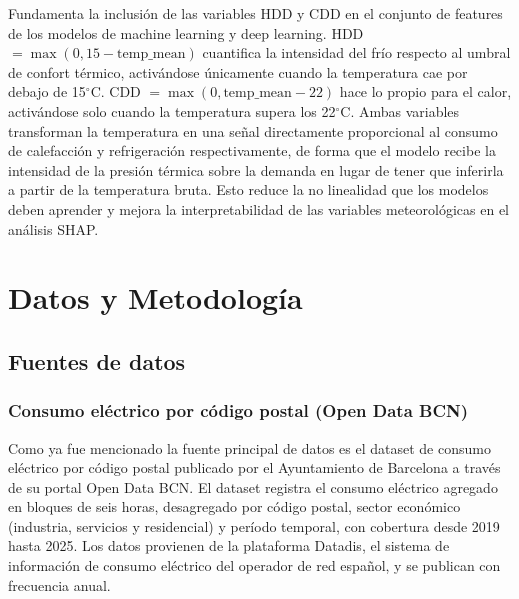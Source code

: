 \documentclass[12pt, a4paper]{article}
\begin{document}
Fundamenta la inclusión de las variables HDD y CDD en el conjunto de features de los modelos de machine learning y deep learning. HDD $= \max(0, 15 - \text{temp\_mean})$ cuantifica la intensidad del frío respecto al umbral de confort térmico, activándose únicamente cuando la temperatura cae por debajo de 15$^\circ$C. CDD $= \max(0, \text{temp\_mean} - 22)$ hace lo propio para el calor, activándose solo cuando la temperatura supera los 22$^\circ$C. Ambas variables transforman la temperatura en una señal directamente proporcional al consumo de calefacción y refrigeración respectivamente, de forma que el modelo recibe  la intensidad de la presión térmica sobre la demanda en lugar de tener que inferirla a partir de la temperatura bruta. Esto reduce la no linealidad que los modelos deben aprender y mejora la interpretabilidad de las variables meteorológicas en el análisis SHAP.

\section{Datos y Metodología}

\subsection{Fuentes de datos}

\subsubsection{Consumo eléctrico por código postal (Open Data BCN)}

Como ya fue mencionado la fuente principal de datos es el dataset de consumo eléctrico por código postal publicado por el Ayuntamiento de Barcelona a través de su portal Open Data BCN. El dataset registra el consumo eléctrico agregado en bloques de seis horas, desagregado por código postal, sector económico (industria, servicios y residencial) y período temporal, con cobertura desde 2019 hasta 2025. Los datos provienen de la plataforma Datadis, el sistema de información de consumo eléctrico del operador de red español, y se publican con frecuencia anual.
\end{document}
